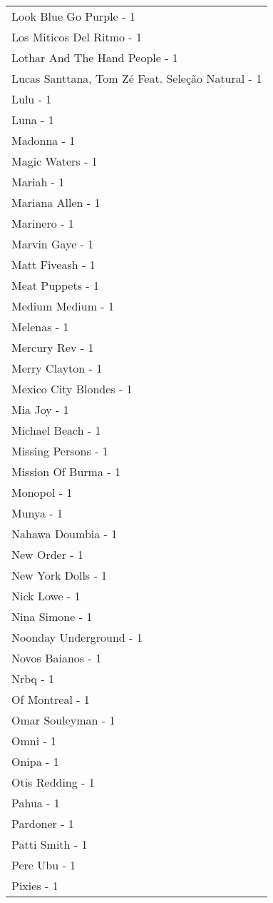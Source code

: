 \documentclass[
]{article}
\begin{document}
\begin{longtable}{l}
Look Blue Go Purple - 1 \\ 
Los Miticos Del Ritmo - 1 \\ 
Lothar And The Hand People - 1 \\ 
Lucas Santtana, Tom Zé Feat. Seleção Natural - 1 \\ 
Lulu - 1 \\ 
Luna - 1 \\ 
Madonna - 1 \\ 
Magic Waters - 1 \\ 
Mariah - 1 \\ 
Mariana Allen - 1 \\ 
Marinero - 1 \\ 
Marvin Gaye - 1 \\ 
Matt Fiveash - 1 \\ 
Meat Puppets - 1 \\ 
Medium Medium - 1 \\ 
Melenas - 1 \\ 
Mercury Rev - 1 \\ 
Merry Clayton - 1 \\ 
Mexico City Blondes - 1 \\ 
Mia Joy - 1 \\ 
Michael Beach - 1 \\ 
Missing Persons - 1 \\ 
Mission Of Burma - 1 \\ 
Monopol - 1 \\ 
Munya - 1 \\ 
Nahawa Doumbia - 1 \\ 
New Order - 1 \\ 
New York Dolls - 1 \\ 
Nick Lowe - 1 \\ 
Nina Simone - 1 \\ 
Noonday Underground - 1 \\ 
Novos Baianos - 1 \\ 
Nrbq - 1 \\ 
Of Montreal - 1 \\ 
Omar Souleyman - 1 \\ 
Omni - 1 \\ 
Onipa - 1 \\ 
Otis Redding - 1 \\ 
Pahua - 1 \\ 
Pardoner - 1 \\ 
Patti Smith - 1 \\ 
Pere Ubu - 1 \\ 
Pixies - 1 \\ 

\end{longtable}
\end{document}
